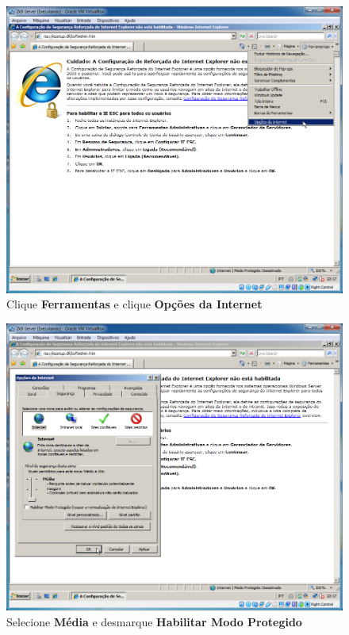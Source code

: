 \documentclass[10pt]{article}
\begin{document}
\begin{figure}[H]
    \centering
    \caption{Clique \textbf{Ferramentas} e clique \textbf{Opções da Internet}}
    \label{fig:re040}
    \includegraphics[width=\linewidth]{images/rede_externa/re040.png}
\end{figure}
\begin{figure}[H]
    \centering
    \caption{Selecione \textbf{Média} e desmarque \textbf{Habilitar Modo Protegido}}
    \label{fig:re042}
    \includegraphics[width=\linewidth]{images/rede_externa/re042.png}
\end{figure}
\end{document}
